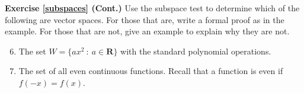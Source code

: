 \documentclass{beamer}
\newcommand{\R}{\mathbf{R}}
\newcommand{\fn}{\insertframenumber}
\theoremstyle{definition}
\newtheorem{exercise}{Exercise}
\begin{document}
\begin{frame}{\fn}
\begin{block}{\textbf{Exercise \ref{subspaces} (Cont.)}}
	Use the subspace test to determine which of the following are vector spaces. For those that are, write a formal proof as in the example. For those that are not, give an example to explain why they are not.
	\begin{enumerate}[label=(\alph*)]\setcounter{enumi}{5}
		\item The set $W=\{ax^2\ :\ a\in\R\}$ with the standard polynomial operations.
		\item The set of all even continuous functions.  Recall that a function is even if $f(-x)=f(x)$.
	\end{enumerate}
\end{block}
\end{frame}
%	
\end{document}
